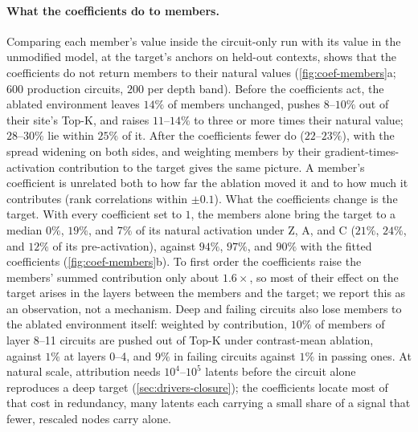 \documentclass[10pt]{article}
\begin{document}
\paragraph{What the coefficients do to members.}
Comparing each member's value inside the circuit-only run with its value in the unmodified model, at the target's anchors on held-out contexts, shows that the coefficients do not return members to their natural values (\cref{fig:coef-members}a; $600$ production circuits, $200$ per depth band).
Before the coefficients act, the ablated environment leaves $14\%$ of members unchanged, pushes $8$--$10\%$ out of their site's Top-K, and raises $11$--$14\%$ to three or more times their natural value; $28$--$30\%$ lie within $25\%$ of it.
After the coefficients fewer do ($22$--$23\%$), with the spread widening on both sides, and weighting members by their gradient-times-activation contribution to the target gives the same picture.
A member's coefficient is unrelated both to how far the ablation moved it and to how much it contributes (rank correlations within $\pm 0.1$).
What the coefficients change is the target.
With every coefficient set to $1$, the members alone bring the target to a median $0\%$, $19\%$, and $7\%$ of its natural activation under Z, A, and C ($21\%$, $24\%$, and $12\%$ of its pre-activation), against $94\%$, $97\%$, and $90\%$ with the fitted coefficients (\cref{fig:coef-members}b).
To first order the coefficients raise the members' summed contribution only about $1.6\times$, so most of their effect on the target arises in the layers between the members and the target; we report this as an observation, not a mechanism.
Deep and failing circuits also lose members to the ablated environment itself: weighted by contribution, $10\%$ of members of layer 8--11 circuits are pushed out of Top-K under contrast-mean ablation, against $1\%$ at layers 0--4, and $9\%$ in failing circuits against $1\%$ in passing ones.
At natural scale, attribution needs $10^{4}$--$10^{5}$ latents before the circuit alone reproduces a deep target (\cref{sec:drivers-closure}); the coefficients locate most of that cost in redundancy, many latents each carrying a small share of a signal that fewer, rescaled nodes carry alone.
\end{document}
